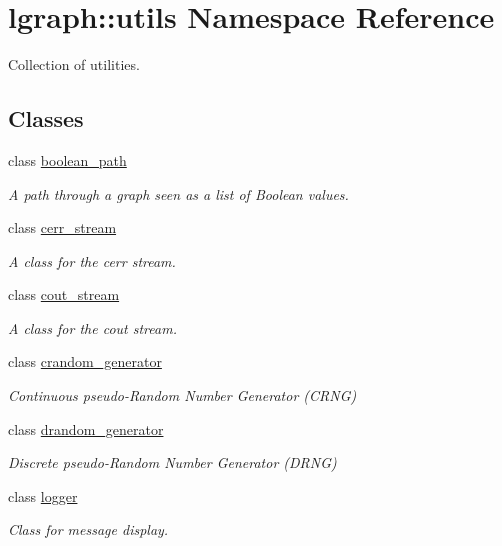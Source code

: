 \hypertarget{namespacelgraph_1_1utils}{}\section{lgraph\+:\+:utils Namespace Reference}
\label{namespacelgraph_1_1utils}


Collection of utilities.  


\subsection*{Classes}
\begin{DoxyCompactItemize}
\item 
class \hyperlink{classlgraph_1_1utils_1_1boolean__path}{boolean\+\_\+path}
\begin{DoxyCompactList}\small\item\em A path through a graph seen as a list of Boolean values. \end{DoxyCompactList}\item 
class \hyperlink{classlgraph_1_1utils_1_1cerr__stream}{cerr\+\_\+stream}
\begin{DoxyCompactList}\small\item\em A class for the cerr stream. \end{DoxyCompactList}\item 
class \hyperlink{classlgraph_1_1utils_1_1cout__stream}{cout\+\_\+stream}
\begin{DoxyCompactList}\small\item\em A class for the cout stream. \end{DoxyCompactList}\item 
class \hyperlink{classlgraph_1_1utils_1_1crandom__generator}{crandom\+\_\+generator}
\begin{DoxyCompactList}\small\item\em Continuous pseudo-\/\+Random Number Generator (C\+R\+NG) \end{DoxyCompactList}\item 
class \hyperlink{classlgraph_1_1utils_1_1drandom__generator}{drandom\+\_\+generator}
\begin{DoxyCompactList}\small\item\em Discrete pseudo-\/\+Random Number Generator (D\+R\+NG) \end{DoxyCompactList}\item 
class \hyperlink{classlgraph_1_1utils_1_1logger}{logger}
\begin{DoxyCompactList}\small\item\em Class for message display. \end{DoxyCompactList}\item 

\end{DoxyCompactItemize}
